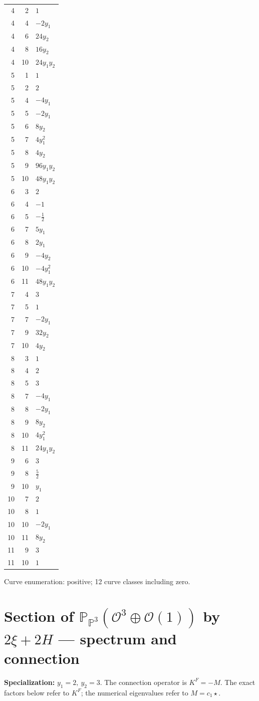 \documentclass[10pt,a4paper]{article}
\begin{document}
{\begin{longtable}{rrp{125mm}}
4 & 2 & $1$\\
4 & 4 & $- 2 y_{1}$\\
4 & 6 & $24 y_{2}$\\
4 & 8 & $16 y_{2}$\\
4 & 10 & $24 y_{1} y_{2}$\\
5 & 1 & $1$\\
5 & 2 & $2$\\
5 & 4 & $- 4 y_{1}$\\
5 & 5 & $- 2 y_{1}$\\
5 & 6 & $8 y_{2}$\\
5 & 7 & $4 y_{1}^{2}$\\
5 & 8 & $4 y_{2}$\\
5 & 9 & $96 y_{1} y_{2}$\\
5 & 10 & $48 y_{1} y_{2}$\\
6 & 3 & $2$\\
6 & 4 & $-1$\\
6 & 5 & $- \frac{1}{2}$\\
6 & 7 & $5 y_{1}$\\
6 & 8 & $2 y_{1}$\\
6 & 9 & $- 4 y_{2}$\\
6 & 10 & $- 4 y_{1}^{2}$\\
6 & 11 & $48 y_{1} y_{2}$\\
7 & 4 & $3$\\
7 & 5 & $1$\\
7 & 7 & $- 2 y_{1}$\\
7 & 9 & $32 y_{2}$\\
7 & 10 & $4 y_{2}$\\
8 & 3 & $1$\\
8 & 4 & $2$\\
8 & 5 & $3$\\
8 & 7 & $- 4 y_{1}$\\
8 & 8 & $- 2 y_{1}$\\
8 & 9 & $8 y_{2}$\\
8 & 10 & $4 y_{1}^{2}$\\
8 & 11 & $24 y_{1} y_{2}$\\
9 & 6 & $3$\\
9 & 8 & $\frac{5}{2}$\\
9 & 10 & $y_{1}$\\
10 & 7 & $2$\\
10 & 8 & $1$\\
10 & 10 & $- 2 y_{1}$\\
10 & 11 & $8 y_{2}$\\
11 & 9 & $3$\\
11 & 10 & $1$\\
\end{longtable}}
Curve enumeration: positive; 12 curve classes including zero.
\clearpage\section*{Section of $\mathbb P_{\mathbb P^{3}}(\mathcal O^{3}\oplus \mathcal O(1))$ by $2\xi +2H$ --- spectrum and connection}
\textbf{Specialization:} $y_1=2,\ y_2=3$. The connection operator is $K^F=-M$. The exact factors below refer to $K^F$; the numerical eigenvalues refer to $M=c_1\star$.
\end{document}

